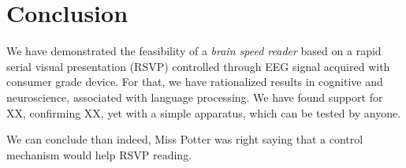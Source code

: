 \section{Conclusion}
\label{conclusion}
We have demonstrated the feasibility of a {\it brain speed reader} based on a rapid serial visual presentation (RSVP) controlled through EEG signal acquired with consumer grade device. For that, we have rationalized results in cognitive and neuroscience, associated with language processing. We have found support for XX, confirming XX, yet with a simple apparatus, which can be tested by anyone.

We can conclude than indeed, Miss Potter \cite{potter1989} was right saying that a control mechanism would help RSVP reading. 
